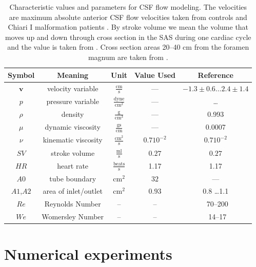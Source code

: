 \begin{table}
  \centering
  \begin{tabular}{ccccc}
    \toprule
    Symbol & Meaning & Unit & Value Used & Reference \\
    \midrule
    $\mathbf{v}$	& velocity variable & $\mathrm{\frac{cm}{s}}$ & --- & $-1.3\pm 0.6 \ldots 2.4 \pm 1.4$  \\
    $p$		& pressure	variable & $\mathrm{\frac{dyne}{cm^2}}$ & --- & \ldots\\
    $\rho$	& density & $\mathrm{\frac{g}{cm^3}}$ & --- &0.993 \\ %
    $\mu$	& dynamic viscosity	&  $\mathrm{\frac{g s}{cm}}$ & --- & 0.0007\\
    $\nu$	& kinematic viscosity & $\mathrm{ \frac{cm^2}{s}}$ & $0.7 10^{-2}$ & $0.7 10^{-2}$ \\ 	\midrule %
    $SV$	& stroke volume 	& $\mathrm{\frac{ml}{s}}$& $0.27$  & $0.27$ \\
    $HR$	& heart rate & $\mathrm{\frac{beats}{s}}$	& 1.17 & 1.17\\
    $A0$	& tube boundary	& $\mathrm{cm^2}$ & $32$  & ---\\
    $A1$,$A2$	& area of inlet/outlet & $\mathrm{cm^2}$ &$0.93$ & 0.8 \ldots 1.1   \\
    \midrule
    $Re$    & Reynolds Number & -- & -- & ~70--200 \\
    $We$    & Womersley Number & -- & -- & ~14--17 \\
    \bottomrule
  \end{tabular}
  \caption{Characteristic values and parameters for CSF flow
    modeling.  The velocities are maximum absolute anterior CSF flow
    velocities taken from controls and Chiari I malformation patients
    \citep{HofmannWarmuth-MetzBendszusEtAl2000}.  By stroke volume
    we mean the volume that moves up and down through cross section
    in the SAS during one cardiac cycle and the value is taken from
    \citep{GuptaSoellingerBoesigerEtAl2009}.  Cross section areas 20--40 cm
    from the foramen magnum are taken from \citep{LothYardimciAlperin2001}.}
  \label{tab:entities}
\end{table}

\section{Numerical experiments}

